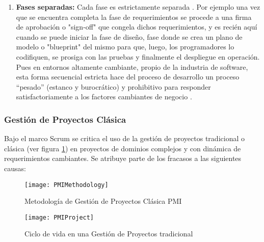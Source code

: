 \begin{enumerate}
\item \textbf{Fases separadas:} \newline
Cada fase es estrictamente separada \cite{Scrum-Institute-2015}. Por ejemplo una vez que se encuentra completa la fase de requerimientos se procede a una firma de aprobación o "sign-off" que congela dichos requerimientos, y es recién aquí cuando se puede iniciar la fase de diseño, fase donde se crea un plano de modelo o "blueprint" del mismo para que, luego, los programadores lo codifiquen, se prosiga con las pruebas y finalmente el despliegue en operación. Pues en entornos altamente cambiante, propio de la industria de software, esta forma secuencial estricta hace del proceso de desarrollo un proceso “pesado” (estanco y burocrático) y prohibitivo para responder satisfactoriamente a los factores cambiantes de negocio \cite{Martin-Alaimo-2014}.

\end{enumerate}

\subsubsection{Gestión de Proyectos Clásica}

Bajo el marco Scrum se critica el uso de la gestión de proyectos tradicional o clásica (ver figura \ref{fig:PMIMethodology}) en proyectos de dominios complejos y con dinámica de requerimientos cambiantes. Se atribuye parte de los fracasos a las siguientes causas:

\begin{figure}[h]
  \centering
  \texttt{[image: PMIMethodology]}
  \caption{Metodología de Gestión de Proyectos Clásica PMI}
  \centering
  \label{fig:PMIMethodology} %
\end{figure}
\begin{figure}[h]
  \centering
  \texttt{[image: PMIProject]}
  \caption{Ciclo de vida en una Gestión de Proyectos tradicional}
  \centering
  \label{fig:PMIProject} %
\end{figure}

